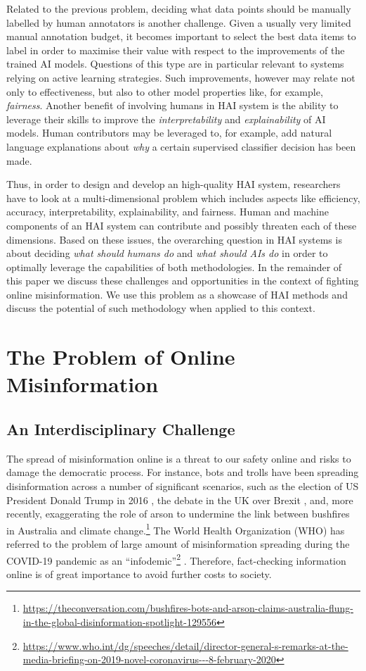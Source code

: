 \documentclass[11pt]{article}
\newcommand{\covid}{COVID-19\xspace}
\begin{document}
Related to the previous problem, deciding what data points should be manually labelled by human annotators is another challenge. Given a usually very limited manual annotation budget, it becomes important to select the best data items to label in order to maximise their value with respect to the improvements of the trained AI models. Questions of this type are in particular relevant to systems relying on active learning strategies. 
Such improvements, however may relate not only to effectiveness, but also to other model properties like, for example, \textit{fairness}. 
% 
Another benefit of involving humans in HAI system is the ability to leverage their skills to improve the \textit{interpretability} and \textit{explainability} of AI models. 
Human contributors may be leveraged to, for example, add natural language explanations about \textit{why} a certain supervised classifier decision has been made. 

Thus, in order to design and develop an high-quality HAI system, researchers have to look at a multi-dimensional problem which includes aspects like efficiency, accuracy, interpretability, explainability, and fairness. Human and machine components of an HAI system can contribute and possibly threaten each of these dimensions. 
% 
Based on these issues, the overarching question in HAI systems is about deciding \textit{what should humans do} and \textit{what should AIs do} in order to optimally leverage the capabilities of both methodologies.
% 
In the remainder of this paper we discuss these challenges and opportunities in the context of fighting online misinformation. We use this problem as a showcase of HAI methods and discuss the potential of such methodology when applied to this context.


\section{The Problem of Online Misinformation}
\label{sec:misinformation}

\subsection{An Interdisciplinary Challenge}
The spread of misinformation online is a threat to our safety online and risks to damage the democratic process.
For instance, bots and trolls have been spreading disinformation across a number of significant scenarios, such as the election of US President Donald Trump in 2016 \cite{bovet2019influence}, the debate in the UK over Brexit \cite{howard2016bots}, and, more recently, exaggerating the role of arson to undermine the link between bushfires in Australia and climate change.\footnote{\url{https://theconversation.com/bushfires-bots-and-arson-claims-australia-flung-in-the-global-disinformation-spotlight-129556}} The World Health Organization (WHO) has referred to the problem of large amount of misinformation spreading during the \covid pandemic as an ``infodemic''\footnote{\url{https://www.who.int/dg/speeches/detail/director-general-s-remarks-at-the-media-briefing-on-2019-novel-coronavirus---8-february-2020}} \cite{alam2020fighting}.
Therefore, fact-checking information online is of great importance to avoid further costs to society. 
\end{document}
